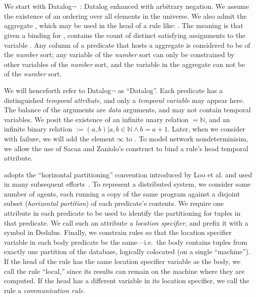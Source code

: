 \section{\large \bf \lang}
\label{sec:slang}

We start with Datalog$\lnot$~\cite{ullmanbook}: Datalog enhanced with arbitrary negation.  We assume the existence of an ordering \dedalus{<} over all elements in the universe.  We also admit the aggregate , which may be used in the head of a rule like: .  The meaning is that given a binding for ,  contains the count of distinct satisfying assignments to the variable .  Any column of a predicate that hosts a  aggregate is considered to be of the {\em number} sort; any variable of the {\em number} sort can only be constrained by other variables of the {\em number} sort, and the variable in the  aggregate can not be of the {\em number} sort.

We will henceforth refer to Datalog$\lnot$ as ``Datalog''.  Each predicate has a distinguished {\em temporal attribute}, and only a {\em temporal variable} may appear here.  The balance of the arguments are {\em data} arguments, and may not contain temporal variables.  We posit the existence of an infinite unary relation  $= \mathbb{N}$, and an infinite binary relation  $:= {(a,b) | a,b \in \mathbb{N} \land b = a + 1}$.  Later, when we consider \lang with failure, we will add the element $\infty$ to .  To model network nondeterminisim, we allow the use of Sacaa and Zaniolo's  construct to bind a rule's head temporal attribute.


\lang adopts the ``horizontal partitioning'' convention introduced by Loo et al. and used in many subsequent efforts~\cite{Loo:2005}. To represent a distributed system, we consider some number of agents, each running a copy of the same program against a disjoint subset ({\em horizontal partition}) of each predicate's contents.  We require one attribute in each predicate to be used to identify the partitioning for tuples in that predicate. We call such an attribute a {\em location specifier}, and prefix it with a \dedalus{\#} symbol in Dedalus.
Finally, we constrain \lang rules so that the location specifier variable in each body predicate be the same---i.e.\ the body contains tuples from exactly one partition of the database, logically colocated (on a single ``machine'').  If the head of the rule has the same location specifier variable as the body, we call the rule ``local,'' since its results can remain on the machine where they are computed.  If the head has a different variable in its location specifier, we call the rule a {\em communication rule}.

